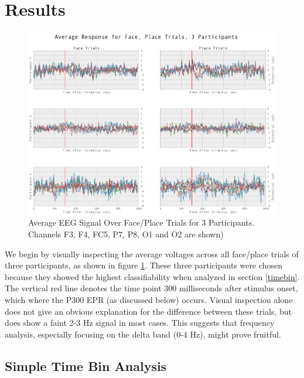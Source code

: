 \documentclass[11pt]{report}
\begin{document}
\section{Results}

\begin{figure}[t]
\centerline{
\includegraphics[width=6in]{3partsfaceplace}
}
\caption{Average EEG Signal Over Face/Place Trials for 3 Participants.  Channels F3, F4, FC5, P7, P8, O1 and O2 are shown) \label{3partsfaceplace}}
\end{figure}

We begin by visually inspecting the average voltages across all face/place trials of three participants, as shown in figure \ref{3partsfaceplace}.  These three participants were chosen because they showed the highest classifiability when analyzed in section \ref{timebin}.  The vertical red line denotes the time point 300 milliseconds after stimulus onset, which where the P300 EPR (as discussed below) occurs.  Visual inspection alone does not give an obvious explanation for the difference between these trials, but does show a faint 2-3 Hz signal in most cases.  This suggests that frequency analysis, especially focusing on the delta band (0-4 Hz), might prove fruitful.

\subsection{Simple Time Bin Analysis \label{timebin}}
\end{document}

